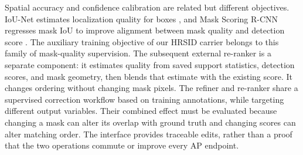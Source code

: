 Spatial accuracy and confidence calibration are related but different objectives. IoU-Net estimates localization quality for boxes \cite{iounet2018}, and Mask Scoring R-CNN regresses mask IoU to improve alignment between mask quality and detection score \cite{msrcnn2019}. The auxiliary training objective of our HRSID carrier belongs to this family of mask-quality supervision. The subsequent external re-ranker is a separate component: it estimates quality from saved support statistics, detection scores, and mask geometry, then blends that estimate with the existing score. It changes ordering without changing mask pixels. The refiner and re-ranker share a supervised correction workflow based on training annotations, while targeting different output variables. Their combined effect must be evaluated because changing a mask can alter its overlap with ground truth and changing scores can alter matching order. The interface provides traceable edits, rather than a proof that the two operations commute or improve every AP endpoint.
